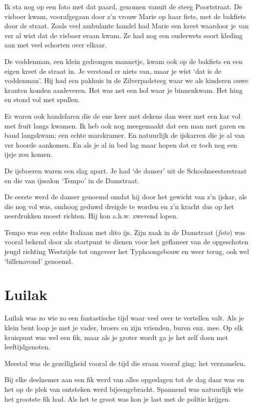 \documentclass[10pt,twoside,openright]{memoir}
\begin{document}
Ik sta nog op een foto met dat paard, genomen vanuit de steeg Poortstraat. De visboer kwam, voorafgegaan door z’n vrouw Marie op haar fiets, met de bakfiets door de straat. Zoals veel ambulante handel had Marie een kreet waardoor je van ver al wist dat de visboer eraan kwam. Ze had nog een ouderwets soort kleding aan met veel schorten over elkaar.

De voddenman, een klein gedrongen mannetje, kwam ook op de bakfiets en een eigen kreet de straat in. Je verstond er niets van, maar je wist ‘dat is de voddenman’. Hij had een pakhuis in de Zilverpadsteeg waar we als kinderen ouwe kranten konden aanleveren. Het was net een hol waar je binnenkwam. Het hing en stond vol met spullen. 

Er waren ook handelaren die de ene keer met dekens dan weer met een kar vol met fruit langs kwamen. Ik heb ook nog meegemaakt dat een man met garen en band langskwam; een echte marskramer. En natuurlijk de ijskarren die je al van ver hoorde aankomen. En als je al in bed lag maar hopen dat er toch nog een ijsje zou komen.

De ijsboeren waren een slag apart. Je had ‘de danser’ uit de Schoolmeesterstraat en die van ijssalon ‘Tempo’ in de Damstraat. 

De eerste werd de danser genoemd omdat hij door het gewicht van z’n ijskar, als die nog vol was, omhoog geduwd dreigde te worden en z’n kracht dus op het neerdrukken moest richten. Hij kon a.h.w. zwevend lopen. 

Tempo was een echte Italiaan met dito ijs. Zijn zaak in de Damstraat (\emph{foto}) was vooral bekend door als startpunt te dienen voor het geflaneer van de opgeschoten jeugd richting Westzijde tot ongeveer het Typhoongebouw en weer terug, ook wel ‘billenavond’ genoemd. 

\chapter{Luilak} %
\label{cha:luilak}

Luilak was zo wie zo een fantastische tijd waar veel over te vertellen valt. Als je klein bent loop je met je vader, broers en zijn vrienden, buren enz. mee. Op elk kruispunt was wel een fik, maar als je groter wordt ga je het zelf doen met leeftijdgenoten. 

Meestal was de gezelligheid vooral de tijd die eraan vooraf ging; het verzamelen. 

Bij elke deelnemer aan een fik werd van alles opgeslagen tot de dag daar was en het op de plek van ontsteken werd bijeengebracht. Spannend was natuurlijk wie het grootste fik had. Als het te groot was kon je last met de politie krijgen.
\end{document}
